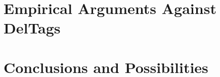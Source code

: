 \documentclass[fleqn,10pt]{SelfArx} %
\begin{document}

\section{Empirical Arguments Against DelTags}




\section{Conclusions and Possibilities}



\end{document}
